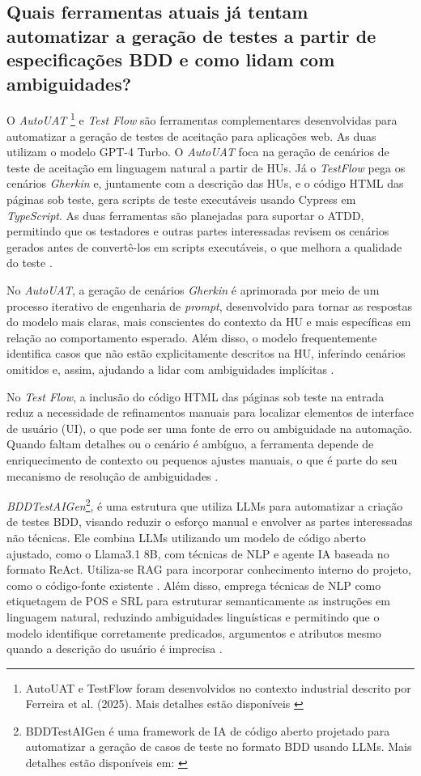 \subsection{Quais ferramentas atuais já tentam automatizar a geração de testes a partir de especificações BDD e como lidam com ambiguidades?}
\label{sec:rsl-ferramentas}


O \textit{AutoUAT} \footnote{AutoUAT e TestFlow foram desenvolvidos no contexto industrial descrito por Ferreira et al. (2025). Mais detalhes estão disponíveis \cite{Ferreira2025}} e \textit{Test Flow} são ferramentas complementares desenvolvidas para automatizar a geração de testes de aceitação para aplicações web. As duas utilizam o modelo GPT-4 Turbo. O \textit{AutoUAT} foca na geração de cenários de teste de aceitação em linguagem natural a partir de HUs. Já o \textit{TestFlow} pega os cenários \textit{Gherkin} e, juntamente com a descrição das HUs, e o código HTML das páginas sob teste, gera scripts de teste executáveis usando Cypress em \textit{TypeScript}. As duas ferramentas são planejadas para suportar o ATDD, permitindo que os testadores e outras partes interessadas revisem os cenários gerados antes de convertê-los em scripts executáveis, o que melhora a qualidade do teste \cite{Ferreira2025}.

No \textit{AutoUAT}, a geração de cenários \textit{Gherkin} é aprimorada por meio de um processo iterativo de engenharia de \textit{prompt}, desenvolvido para tornar as respostas do modelo mais claras, mais conscientes do contexto da HU e mais específicas em relação ao comportamento esperado. Além disso, o modelo frequentemente identifica casos que não estão explicitamente descritos na HU, inferindo cenários omitidos e, assim, ajudando a lidar com ambiguidades implícitas \cite{Ferreira2025}.

No \textit{Test Flow}, a inclusão do código HTML das páginas sob teste na entrada reduz a necessidade de refinamentos manuais para localizar elementos de interface de usuário (UI), o que pode ser uma fonte de erro ou ambiguidade na automação. Quando faltam detalhes ou o cenário é ambíguo, a ferramenta depende de enriquecimento de contexto ou pequenos ajustes manuais, o que é parte do seu mecanismo de resolução de ambiguidades \cite{Ferreira2025}.

\textit{BDDTestAIGen}\footnote{BDDTestAIGen é uma framework de IA de código aberto projetado para automatizar a geração de casos de teste no formato BDD usando LLMs. Mais detalhes estão disponíveis em: \cite{Paduraru2025}}, é uma estrutura que utiliza LLMs para automatizar a criação de testes BDD, visando reduzir o esforço manual e envolver as partes interessadas não técnicas. Ele combina LLMs utilizando um modelo de código aberto ajustado, como o Llama3.1 8B, com técnicas de NLP e agente IA baseada no formato ReAct. Utiliza-se RAG para incorporar conhecimento interno do projeto, como o código-fonte existente \cite{Paduraru2025}. Além disso, emprega técnicas de NLP como etiquetagem de POS e SRL para estruturar semanticamente as instruções em linguagem natural, reduzindo ambiguidades linguísticas e permitindo que o modelo identifique corretamente predicados, argumentos e atributos mesmo quando a descrição do usuário é imprecisa \cite{Paduraru2025}.

